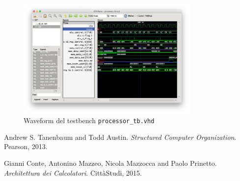 \documentclass[a4paper,12pt]{scrreprt}
\begin{document}
\begin{figure}
  \centering
  \includegraphics[width=0.8\textwidth]{waveform.png}
  \caption{Waveform del testbench \lstinline{processor_tb.vhd}}\label{fig:waveform}
\end{figure}

\begin{thebibliography}{2}
  Andrew S. Tanenbaum and Todd Austin.
  \textit{Structured Computer Organization}.
  Pearson, 2013.

  Gianni Conte, Antonino Mazzeo, Nicola Mazzocca and Paolo Prinetto.
  \textit{Architettura dei Calcolatori}.
  CittàStudi, 2015.
\end{thebibliography}
\end{document}
